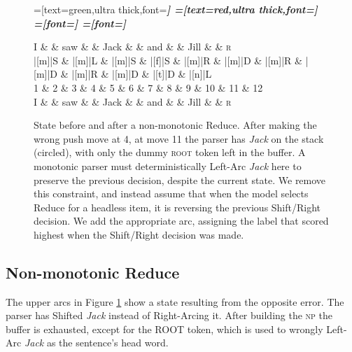 \documentclass[11pt,letterpaper]{article}
\begin{document}
\begin{figure}
    \centering
    \begin{dependency}[theme=simple]
    =[text=green,ultra thick,font=\bfseries\itshape]
    =[text=red,ultra thick,font=\bfseries\itshape]
    =[font=\bfseries\itshape]
    =[font=\itshape]
    \begin{deptext}[column sep=.075cm, row sep=.1ex]
        I \&           \& saw \&          \& Jack       \& \& and     \&           \& Jill \&   \& \textsc{r} \\
       |[m]|S \& |[m]|L \& |[m]|S   \& |[f]|S \& |[m]|R \& |[m]|D \& |[m]|R \& |[m]|D \& |[m]|R \& |[m]|D \& |[t]|D \& |[n]|L \\
            1 \&     2       \& 3  \&   4      \& 5          \& 6 \& 7     \& 8 \& 9 \& 10 \& 11 \& 12 \\
            I \&           \& saw \&          \& Jack       \& \& and     \&           \& Jill \& \& \textsc{r} \\
\end{deptext}
    
    
\end{dependency}
\caption{
    \small
State before and after a non-monotonic Reduce.
After making the wrong push move at 4, at move 11
the parser has \emph{Jack} on the stack (circled), with only the dummy \textsc{root}
token left in the buffer. A monotonic parser must deterministically Left-Arc
\emph{Jack} here to preserve the previous decision, despite the current state.
We remove this constraint, and instead assume that when the model selects Reduce
for a headless item, it is reversing the previous Shift/Right decision. We add
the appropriate arc, assigning the label that scored highest when the Shift/Right
decision was made.
\label{fig:adduce}}
\end{figure}


\subsection{Non-monotonic Reduce}

The upper arcs in Figure \ref{fig:adduce} show a state resulting from the opposite error.
The parser has Shifted \emph{Jack} instead of Right-Arcing it. After
building the \textsc{np} the buffer is exhausted, except for the ROOT token,
which is used to wrongly Left-Arc \emph{Jack} as the sentence's head word.
\end{document}
